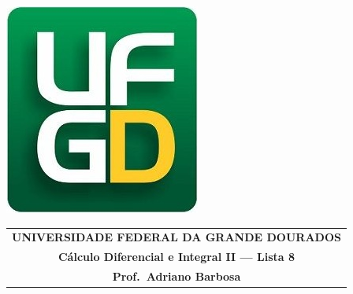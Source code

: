 \documentclass[a4paper,5pt]{amsbook}
\begin{document}
\thispagestyle{empty}
\pagestyle{empty}
\begin{minipage}[h]{0.14\textwidth}
	\includegraphics[scale=0.24]{../../ufgd.png}
\end{minipage}
\begin{minipage}[h]{\textwidth}
\begin{tabular}{c}
{{\bf UNIVERSIDADE FEDERAL DA GRANDE DOURADOS}}\\
{{\bf C\'{a}lculo Diferencial e Integral II --- Lista 8}}\\
{{\bf Prof.\ Adriano Barbosa}}\\
\end{tabular}
\vspace{-0.45cm}
%
\end{minipage}

\end{document}
